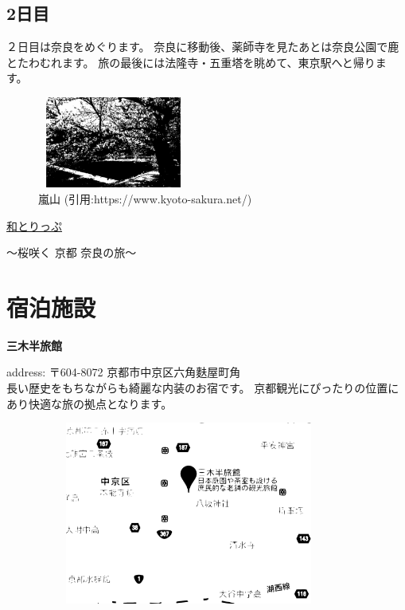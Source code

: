 \documentclass[12pt]{jarticle}
\begin{document}
\subsection{2日目}
２日目は奈良をめぐります。 奈良に移動後、薬師寺を見たあとは奈良公園で鹿とたわむれます。 旅の最後には法隆寺・五重塔を眺めて、東京駅へと帰ります。
\begin{figure}[h]
    \begin{center}
        \includegraphics[height=3cm, width=5cm]{arashiyama.eps}
    \end{center}
\caption{嵐山 (引用:https://www.kyoto-sakura.net/)}
\end{figure}

\clearpage
\begin{center}
    {\Huge \underline{和とりっぷ}}

    〜桜咲く 京都 奈良の旅〜
\end{center}
\section{宿泊施設}
{\large \textbf{三木半旅館}}

address: 〒604-8072 京都市中京区六角麩屋町角 \\


長い歴史をもちながらも綺麗な内装のお宿です。
京都観光にぴったりの位置にあり快適な旅の拠点となります。
\begin{figure}[h]
    \begin{center}
        \includegraphics[height=6cm, width=10cm]{map.eps}
    \end{center}
\end{figure}
\end{document}
